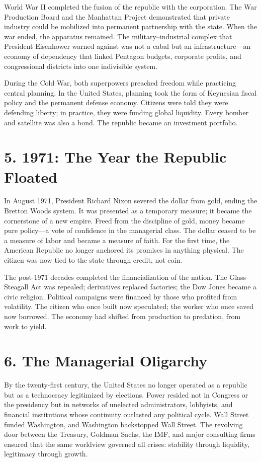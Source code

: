 \documentclass[11pt,twoside]{book}
\begin{document}
World War II completed the fusion of the republic with the corporation.  
The War Production Board and the Manhattan Project demonstrated that private industry could be mobilized into permanent partnership with the state.  
When the war ended, the apparatus remained.  
The military–industrial complex that President Eisenhower warned against was not a cabal but an infrastructure—an economy of dependency that linked Pentagon budgets, corporate profits, and congressional districts into one indivisible system.

During the Cold War, both superpowers preached freedom while practicing central planning.  
In the United States, planning took the form of Keynesian fiscal policy and the permanent defense economy.  
Citizens were told they were defending liberty; in practice, they were funding global liquidity.  
Every bomber and satellite was also a bond.  
The republic became an investment portfolio.

\section*{5. 1971: The Year the Republic Floated}

In August 1971, President Richard Nixon severed the dollar from gold, ending the Bretton Woods system.  
It was presented as a temporary measure; it became the cornerstone of a new empire.  
Freed from the discipline of gold, money became pure policy—a vote of confidence in the managerial class.  
The dollar ceased to be a measure of labor and became a measure of faith.  
For the first time, the American Republic no longer anchored its promises in anything physical.  
The citizen was now tied to the state through credit, not coin.

The post-1971 decades completed the financialization of the nation.  
The Glass–Steagall Act was repealed; derivatives replaced factories; the Dow Jones became a civic religion.  
Political campaigns were financed by those who profited from volatility.  
The citizen who once built now speculated; the worker who once saved now borrowed.  
The economy had shifted from production to predation, from work to yield.

\section*{6. The Managerial Oligarchy}

By the twenty-first century, the United States no longer operated as a republic but as a technocracy legitimized by elections.  
Power resided not in Congress or the presidency but in networks of unelected administrators, lobbyists, and financial institutions whose continuity outlasted any political cycle.  
Wall Street funded Washington, and Washington backstopped Wall Street.  
The revolving door between the Treasury, Goldman Sachs, the IMF, and major consulting firms ensured that the same worldview governed all crises: stability through liquidity, legitimacy through growth.
\end{document}

